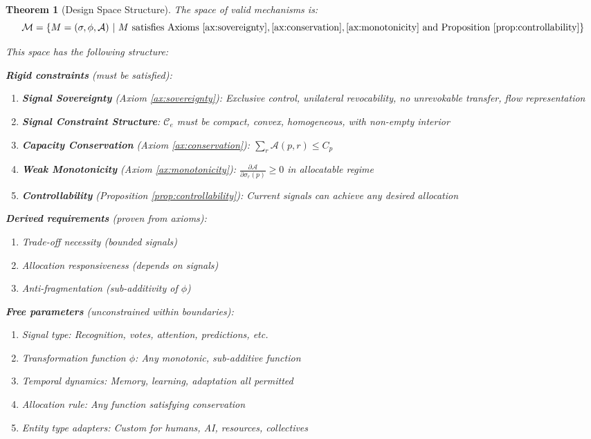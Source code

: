 \documentclass[11pt,a4paper]{article}
\newtheorem{theorem}{Theorem}[section]
\theoremstyle{definition}
\theoremstyle{remark}
\newcommand{\A}{\mathcal{A}}
\newcommand{\C}{\mathcal{C}}
\begin{document}
\begin{theorem}[Design Space Structure]
\label{thm:design-space}
The space of valid mechanisms is:
\[ \mathcal{M} = \left\{ M = (\sigma, \phi, \A) \ \middle| \ M \text{ satisfies Axioms } \ref{ax:sovereignty}, \ref{ax:conservation}, \ref{ax:monotonicity} \text{ and Proposition } \ref{prop:controllability} \right\} \]

This space has the following structure:

\textbf{Rigid constraints} (must be satisfied):
\begin{enumerate}
\item \textbf{Signal Sovereignty} (Axiom \ref{ax:sovereignty}): Exclusive control, unilateral revocability, no unrevokable transfer, flow representation
\item \textbf{Signal Constraint Structure}: $\C_e$ must be compact, convex, homogeneous, with non-empty interior
\item \textbf{Capacity Conservation} (Axiom \ref{ax:conservation}): $\sum_r \A(p,r) \le C_p$
\item \textbf{Weak Monotonicity} (Axiom \ref{ax:monotonicity}): $\frac{\partial \A}{\partial \sigma_r(p)} \ge 0$ in allocatable regime
\item \textbf{Controllability} (Proposition \ref{prop:controllability}): Current signals can achieve any desired allocation
\end{enumerate}

\textbf{Derived requirements} (proven from axioms):
\begin{enumerate}
\item Trade-off necessity (bounded signals)
\item Allocation responsiveness (depends on signals)
\item Anti-fragmentation (sub-additivity of $\phi$)
\end{enumerate}

\textbf{Free parameters} (unconstrained within boundaries):
\begin{enumerate}
\item Signal type: Recognition, votes, attention, predictions, etc.
\item Transformation function $\phi$: Any monotonic, sub-additive function
\item Temporal dynamics: Memory, learning, adaptation all permitted
\item Allocation rule: Any function satisfying conservation
\item Entity type adapters: Custom for humans, AI, resources, collectives
\end{enumerate}
\end{theorem}
\end{document}
